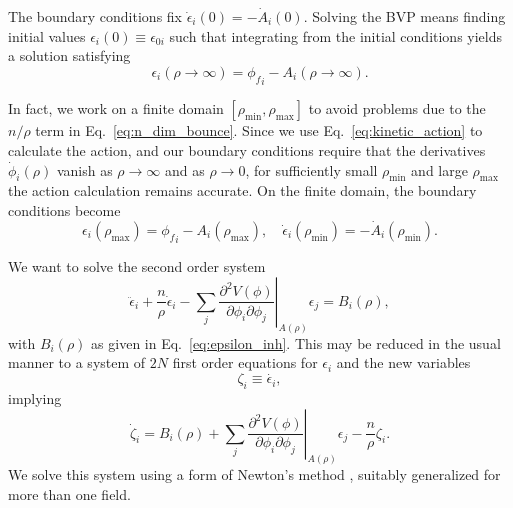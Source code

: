 \documentclass[final,3p,11pt,pdflatex]{elsarticle}
\renewcommand{\refeq}[1]{Eq.~\ref{#1}}
\newcommand{\fv}{\ensuremath{\phi_f}}
\newcommand{\rhomin}{\ensuremath{\rho_{\text{min}}}}
\newcommand{\rhomax}{\ensuremath{\rho_{\text{max}}}}
\begin{document}
The boundary conditions fix $\dot{\epsilon}_i(0) = -\dot{A}_i(0)$.  Solving the
BVP means finding initial values $\epsilon_i(0) \equiv \epsilon_{0i}$ such that
integrating from the initial conditions yields a solution satisfying
\begin{equation}
\epsilon_i(\rho\to\infty) = {\fv}_i - A_i(\rho\to\infty).
\end{equation}

In fact, we work on a finite domain $[\rhomin, \rhomax]$ to avoid problems due
to the $n/\rho$ term in \refeq{eq:n_dim_bounce}.  Since we use
\refeq{eq:kinetic_action} to calculate the action, and our boundary conditions
require that the derivatives $\dot{\phi}_i(\rho)$ vanish as $\rho \rightarrow
\infty$ and as $\rho \rightarrow 0$, for sufficiently small $\rhomin$ and large
$\rhomax$ the action calculation remains accurate.  On the finite domain, the
boundary conditions become
%
\begin{equation}\label{eq:perturbation_bcs_finite}
  \epsilon_i(\rhomax) = {\fv}_i - A_i(\rhomax), \quad
  \dot{\epsilon}_i(\rhomin) = -\dot{A}_i(\rhomin).
\end{equation}

We want to solve the second order system
%
\begin{equation}
  \ddot{\epsilon}_i + \frac{n}{\rho}\dot{\epsilon}_i
  - \left.\sum_j\frac{\partial^2 V(\phi)}{\partial \phi_i \partial \phi_j}
  \right|_{A(\rho)} \epsilon_j = B_i(\rho),
\end{equation}
%
with $B_i(\rho)$ as given in \refeq{eq:epsilon_inh}.
This may be reduced in the usual manner to a system of $2N$ first order
equations for $\epsilon_i$ and the new variables
%
\begin{equation}
\zeta_i \equiv \dot{\epsilon_i} ,
\end{equation}
implying
\begin{equation}
  \dot{\zeta}_i = B_i(\rho) + \left.\sum_j \frac{\partial^2 V(\phi)}
      {\partial \phi_i \partial \phi_j}\right|_{A(\rho)} \epsilon_j
      - \frac{n}{\rho}\zeta_i.
\end{equation}
We solve this system using a form of Newton's method
\cite{VetterlingNumericalRecipesExample2017}, suitably generalized
for more than one field.
\end{document}
